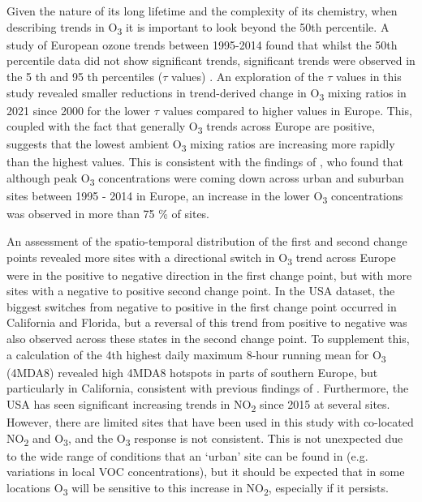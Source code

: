 \documentclass[journal abbreviation, manuscript]{copernicus}
\begin{document}
Given the nature of its long lifetime and the complexity of its chemistry, when describing trends in O\textsubscript{3} it is important to look beyond the 50th percentile. A study of European ozone trends between 1995-2014 found that whilst the 50th percentile data did not show significant trends, significant trends were observed in the 5 th and 95 th percentiles ($\tau$ values) \citep{acp-18-5589-2018}. An exploration of the $\tau$ values in this study revealed smaller reductions in trend-derived change in O\textsubscript{3} mixing ratios in 2021 since 2000 for the lower $\tau$ values compared to higher values in Europe. This, coupled with the fact that generally O\textsubscript{3} trends across Europe are positive, suggests that the lowest ambient O\textsubscript{3} mixing ratios are increasing more rapidly than the highest values. This is consistent with the findings of \cite{acp-18-5589-2018}, who found that although peak O\textsubscript{3} concentrations were coming down across urban and suburban sites between 1995 - 2014 in Europe, an increase in the lower O\textsubscript{3} concentrations was observed in more than 75 \% of sites. 

An assessment of the spatio-temporal distribution of the first and second change points revealed more sites with a directional switch in O\textsubscript{3} trend across Europe were in the positive to negative direction in the first change point, but with more sites with a negative to positive second change point. In the USA dataset, the biggest switches from negative to positive in the first change point occurred in California and Florida, but a reversal of this trend from positive to negative was also observed across these states in the second change point. To supplement this, a calculation of the 4th highest daily maximum 8-hour running mean for O\textsubscript{3} (4MDA8) revealed high 4MDA8 hotspots in parts of southern Europe, but particularly in California, consistent with previous findings of \cite{fleming_2018}. Furthermore, the USA has seen significant increasing trends in NO\textsubscript{2} since 2015 at several sites. However, there are limited sites that have been used in this study with co-located NO\textsubscript{2} and O\textsubscript{3}, and the O\textsubscript{3} response is not consistent. This is not unexpected due to the wide range of conditions that an ‘urban’ site can be found in (e.g. variations in local VOC concentrations), but it should be expected that in some locations O\textsubscript{3} will be sensitive to this increase in NO\textsubscript{2}, especially if it persists.
\end{document}
